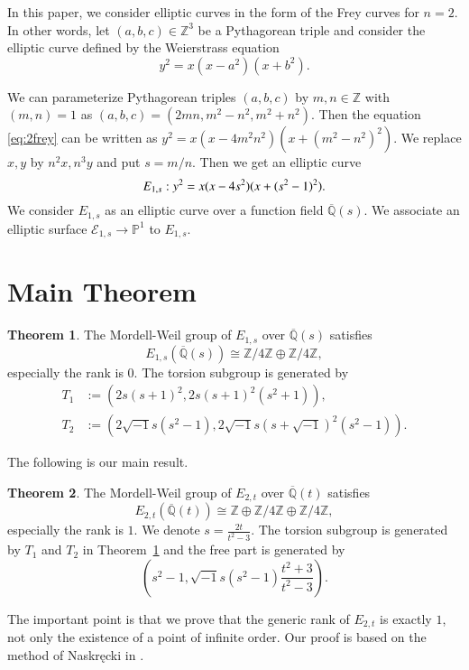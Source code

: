 \documentclass[a4paper]{jarticle} %
\theoremstyle{definition}
\newtheorem{thm}{Theorem}[section]
\theoremstyle{remark}
\begin{document}
In this paper, we consider elliptic curves in the form of the Frey curves for $n=2$.
In other words, let $(a,b,c)\in\mathbb{Z}^3$ be a Pythagorean triple and consider the elliptic curve defined by the Weierstrass equation
\begin{equation}
    \label{eq:2frey}
    y^{2} = x(x - a^{2})(x + b^{2}).
\end{equation}

We can parameterize Pythagorean triples $(a,b,c)$ by $m,n \in \mathbb{Z}$ with $(m,n)=1$ as $(a,b,c) = (2mn, m^{2} - n^{2}, m^{2} + n^{2})$.
Then the equation \eqref{eq:2frey} can be written as $y^{2} = x(x - 4m^2n^2)(x + (m^{2} - n^2)^{2})$.
We replace $x,y$ by $n^2x, n^3y$ and put $s = m/n$.
Then we get an elliptic curve
\begin{equation}
    \label{eq:E_{1,s}}
    E_{1,s}: y^{2} = x(x - 4s^{2})(x + (s^{2} - 1)^{2}).
\end{equation}
We consider $E_{1,s}$ as an elliptic curve over a function field $\overline{\mathbb{Q}}(s)$.
We associate an elliptic surface $\mathcal{E}_{1,s} \to \mathbb{P}^1$ to $E_{1,s}$.


\section{Main Theorem}

\begin{thm}
    \label{thm:E_{1,s}}
    The Mordell-Weil group of $E_{1,s}$ over $\overline{\mathbb{Q}}(s)$ satisfies
    \begin{equation*}
        E_{1,s}(\overline{\mathbb{Q}}(s)) \cong \mathbb{Z} / 4 \mathbb{Z} \oplus \mathbb{Z} / 4 \mathbb{Z},
    \end{equation*}
    especially the rank is $0$. The torsion subgroup is generated by
    \begin{align*}
        T_1 & := (2s(s+1)^2, 2s(s+1)^2(s^2+1)),                              \\
        T_2 & := (2 \sqrt{-1} s(s^2-1),2 \sqrt{-1} s(s+\sqrt{-1})^2(s^2-1)).
    \end{align*}
\end{thm}

The following is our main result.
\begin{thm}
    \label{thm:E_{2,t}}
    The Mordell-Weil group of $E_{2,t}$ over $\overline{\mathbb{Q}}(t)$ satisfies
    \begin{equation*}
        E_{2,t}(\overline{\mathbb{Q}}(t)) \cong \mathbb{Z} \oplus \mathbb{Z} / 4 \mathbb{Z} \oplus \mathbb{Z} / 4 \mathbb{Z},
    \end{equation*}
    especially the rank is $1$.
    We denote $s = \frac{2t}{t^{2} - 3}$. The torsion subgroup is generated by $T_1$ and $T_2$ in Theorem~\ref{thm:E_{1,s}} and the free part is generated by
    \begin{equation*}
        \left(s^{2} - 1, \sqrt{-1} s(s^{2} - 1) \frac{t^{2} + 3}{t^{2} - 3} \right).
    \end{equation*}
\end{thm}
The important point is that we prove that the generic rank of $E_{2,t}$ is exactly $1$, not only the existence of a point of infinite order.
Our proof is based on the method of Naskręcki in \cite{ref:naskrecki2013}.
\end{document}
